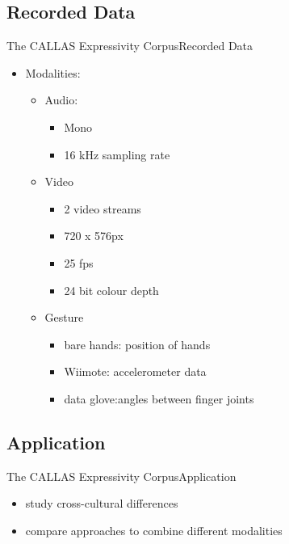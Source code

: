 \documentclass{beamer}
\begin{document}
			\subsection{Recorded Data}
				\begin{frame}{The CALLAS Expressivity Corpus}{Recorded Data}										
					\begin{itemize}
						\item Modalities:
						\begin{itemize}
							\item Audio:
							 \begin{itemize}
							 	\item Mono
							 	\item 16 kHz sampling rate
							 \end{itemize}
							 \item Video
							 \begin{itemize}
							 	\item 2 video streams
							 	\item 720 x 576px
							 	\item 25 fps
							 	\item 24 bit colour depth
							 \end{itemize}
							 \item Gesture
							 \begin{itemize}
							 	\item bare hands: position of hands
							 	\item Wiimote: accelerometer data
							 	\item data glove:angles between finger joints
							 \end{itemize}
						\end{itemize}
					\end{itemize}
				\end{frame}
			\subsection{Application}
				\begin{frame}{The CALLAS Expressivity Corpus}{Application}
					\begin{itemize}
						\item study cross-cultural differences
						\item compare approaches to combine different modalities
					\end{itemize}
				\end{frame}	
		
\end{document}

